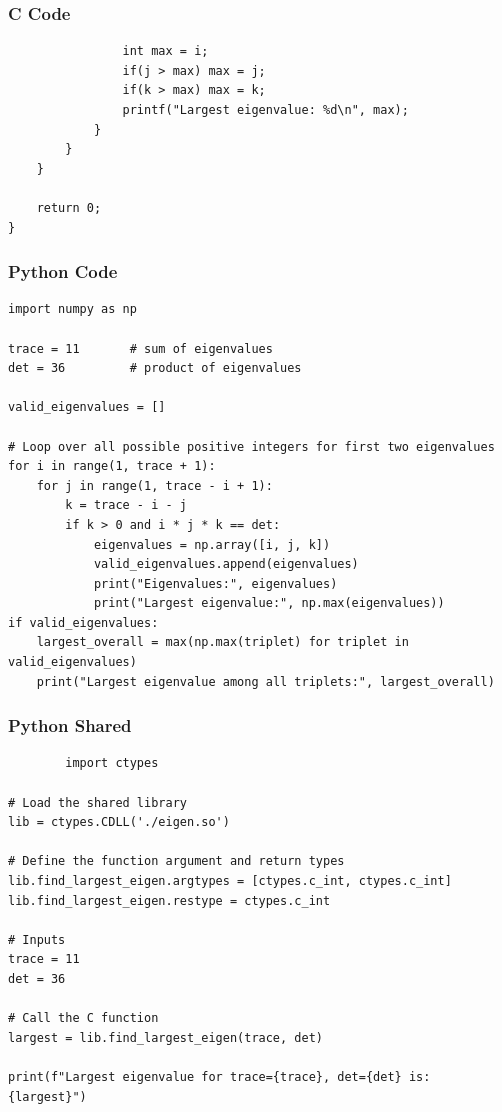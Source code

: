 \documentclass{beamer}
\begin{document}
\begin{frame}[fragile]
\frametitle{C Code}
    \begin{lstlisting}
                int max = i;
                if(j > max) max = j;
                if(k > max) max = k;
                printf("Largest eigenvalue: %d\n", max);
            }
        }
    }

    return 0;
}
    \end{lstlisting}
\end{frame}
\begin{frame}[fragile]
\frametitle{Python Code}
    \begin{lstlisting}
import numpy as np

trace = 11       # sum of eigenvalues
det = 36         # product of eigenvalues

valid_eigenvalues = []

# Loop over all possible positive integers for first two eigenvalues
for i in range(1, trace + 1):
    for j in range(1, trace - i + 1):
        k = trace - i - j
        if k > 0 and i * j * k == det:
            eigenvalues = np.array([i, j, k])
            valid_eigenvalues.append(eigenvalues)
            print("Eigenvalues:", eigenvalues)
            print("Largest eigenvalue:", np.max(eigenvalues))
if valid_eigenvalues:
    largest_overall = max(np.max(triplet) for triplet in valid_eigenvalues)
    print("Largest eigenvalue among all triplets:", largest_overall)        
    \end{lstlisting}
\end{frame}
\begin{frame}[fragile]
\frametitle{Python Shared}
    \begin{lstlisting}
        import ctypes

# Load the shared library
lib = ctypes.CDLL('./eigen.so')

# Define the function argument and return types
lib.find_largest_eigen.argtypes = [ctypes.c_int, ctypes.c_int]
lib.find_largest_eigen.restype = ctypes.c_int

# Inputs
trace = 11
det = 36

# Call the C function
largest = lib.find_largest_eigen(trace, det)

print(f"Largest eigenvalue for trace={trace}, det={det} is: {largest}")
    \end{lstlisting}
\end{frame}
\end{document}
